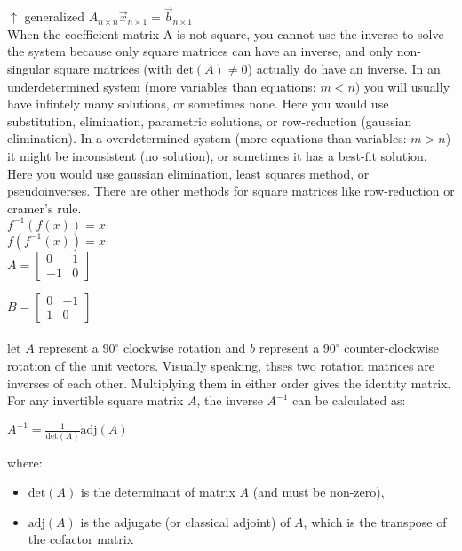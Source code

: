 \documentclass{article}
\begin{document}
$\uparrow$ generalized $A_{n \times n}\vec{x}_{n \times 1} = \vec{b}_{n \times 1}$\\

When the coefficient matrix A is not square, you cannot use the inverse to solve the system because only square matrices can have an inverse, and only non-singular square matrices (with $\text{det}(A) \neq 0$) actually do have an inverse. In an underdetermined system (more variables than equations: $m < n$) you will usually have infintely many solutions, or sometimes none. Here you would use substitution, elimination, parametric solutions, or row-reduction (gaussian elimination). In a overdetermined system (more equations than variables: $m > n$) it might be inconsistent (no solution), or sometimes it has a best-fit solution. Here you would use gaussian elimination, least squares method, or pseudoinverses. There are other methods for square matrices like row-reduction or cramer's rule.\\

$f^{-1}(f(x)) = x$\\
$f(f^{-1}(x)) = x$\\

$A =
\begin{bmatrix}
0 & 1\\
-1 & 0
\end{bmatrix}
$

$B =
\begin{bmatrix}
0 & -1\\
1 & 0
\end{bmatrix}
$\\\\

let $A$ represent a $90^{\circ}$ clockwise rotation and $b$ represent a $90^{\circ}$ counter-clockwise rotation of the unit vectors. Visually speaking, thses two rotation matrices are inverses of each other. Multiplying them in either order gives the identity matrix.\\

For any invertible square matrix $A$, the inverse $A^{-1}$ can be calculated as:\\
\begin{center}
	$A^{-1} = \frac{1}{\text{det}(A)}\text{adj}(A)$
\end{center}
where:
	\begin{itemize}
		\item $\text{det}(A)$ is the determinant of matrix $A$ (and must be non-zero),
		\item $\text{adj}(A)$ is the adjugate (or classical adjoint) of $A$, which is the transpose of the cofactor matrix
	\end{itemize}
\end{document}
